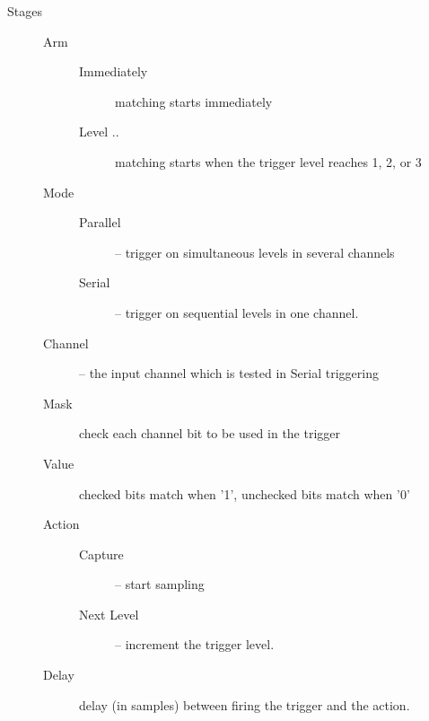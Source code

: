 \documentclass{article}
\begin{document}
\begin{description}
\begin{description}
\item [Stages] \hfill
\begin{description}
  \item [Arm] \hfill 
  \begin{description}
    \item [Immediately] matching starts  immediately
    \item [Level ..] matching starts when the trigger level reaches 1, 2, or 3
    \end{description}
  \item [Mode] \hfill
  \begin{description}  
    \item[Parallel] -- trigger on simultaneous levels in several channels
    \item[Serial] -- trigger on sequential levels in one channel.
  \end{description}
  \item [Channel] -- the input channel which is tested in Serial triggering
  \item [Mask]	check each channel bit to be used in the trigger
  \item [Value]	checked bits match when '1', unchecked bits match when '0'
  \item [Action] \hfill
  \begin{description}  
    \item[Capture] -- start sampling
    \item[Next Level] -- increment the trigger level.
  \end{description}
  \item [Delay]	delay (in samples) between firing the trigger and the action.
  \end{description}
\end{description} %
\end{description} %
\end{document}

